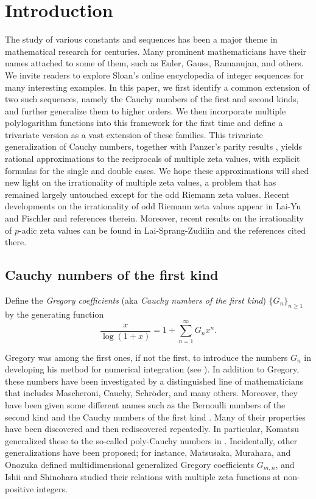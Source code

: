\documentclass[11pt]{article}
\theoremstyle{plain}
\theoremstyle{definition}
\begin{document}


\section{Introduction}

The study of various constants and sequences has been a major theme in mathematical research for centuries. Many prominent mathematicians have their names attached to some of them, such as Euler, Gauss, Ramanujan, and others. We invite readers to explore Sloan's online encyclopedia of integer sequences \cite{Sloane2025} for many interesting examples. In this paper, we first identify a common extension of two such sequences, namely the Cauchy numbers of the first and second kinds, and further generalize them to higher orders. We then incorporate multiple polylogarithm functions into this framework for the first time and define a trivariate version as a vast extension of these families. This trivariate generalization of Cauchy numbers, together with Panzer's parity results \cite{Panzer2017}, yields rational approximations to the reciprocals of multiple zeta values, with explicit formulas for the single and double cases. We hope these approximations will shed new light on the irrationality of multiple zeta values, a problem that has remained largely untouched except for the odd Riemann zeta values. Recent developments on the irrationality of odd Riemann zeta values appear in Lai-Yu \cite{LY2020} and Fischler \cite{Fischler2026} and references therein. Moreover, recent results on the irrationality of $p$-adic zeta values can be found in Lai-Sprang-Zudilin \cite{LSZ2026} and the references cited there.

\subsection{Cauchy numbers of the first kind}
Define the \emph{Gregory coefficients} (aka \emph{Cauchy numbers of the first kind}) $\{G_n\}_{n\geq 1}$ by the generating function
\begin{equation}\label{defn-Gregorycoefficients1}
\frac{x}{\log(1+x)}=1+\sum_{n=1}^\infty G_nx^n.
\end{equation}

Gregory was among the first ones, if not the first, to introduce the numbers $G_n$ in developing his method for numerical integration (see \cite{Phillips1972}). In addition to Gregory, these numbers have been investigated by a distinguished line of mathematicians that includes Mascheroni, Cauchy, Schr\"oder, and many others. Moreover, they have been given some different names such as the Bernoulli numbers of the second kind \cite{Bl2017,Roman1984} and the Cauchy numbers of the first kind \cite{CC2012,Komatsu2013,MSC2006}. Many of their properties have been discovered and then rediscovered repeatedly. In particular, Komatsu generalized these to the so-called poly-Cauchy numbers in \cite{Komatsu2013}. Incidentally, other generalizations have been proposed; for instance, Matsusaka, Murahara, and Onozuka \cite{MMO2025} defined multidimensional generalized Gregory coefficients $G_{m,n}$, and Ishii and Shinohara \cite{ISSH2025} studied their relations with multiple zeta functions at non-positive integers.
\end{document}

